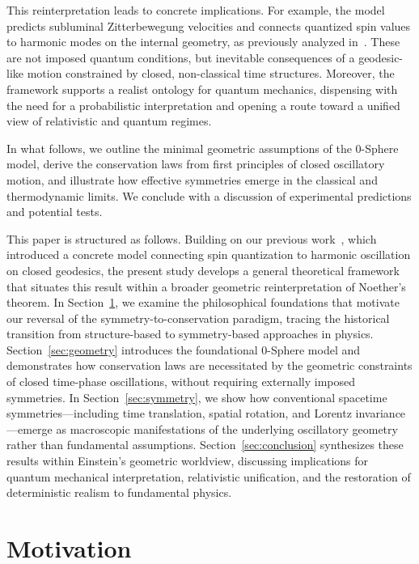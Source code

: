 \documentclass[%
 reprint,
 amsmath,amssymb,
 aps,
]{revtex4-1}
\numberwithin{equation}{section}%
\begin{document}
This reinterpretation leads to concrete implications. For example, the model predicts subluminal Zitterbewegung velocities and connects quantized spin values to harmonic modes on the internal geometry, as previously analyzed in~\cite{hanamura2507.0128}. These are not imposed quantum conditions, but inevitable consequences of a geodesic-like motion constrained by closed, non-classical time structures. Moreover, the framework supports a realist ontology for quantum mechanics, dispensing with the need for a probabilistic interpretation and opening a route toward a unified view of relativistic and quantum regimes.

In what follows, we outline the minimal geometric assumptions of the 0-Sphere model, derive the conservation laws from first principles of closed oscillatory motion, and illustrate how effective symmetries emerge in the classical and thermodynamic limits. We conclude with a discussion of experimental predictions and potential tests.

This paper is structured as follows. Building on our previous work~\cite{hanamura2506.0119,hanamura2507.0128}, which introduced a concrete model connecting spin quantization to harmonic oscillation on closed geodesics, the present study develops a general theoretical framework that situates this result within a broader geometric reinterpretation of Noether's theorem. In Section~\ref{sec:motivation}, we examine the philosophical foundations that motivate our reversal of the symmetry-to-conservation paradigm, tracing the historical transition from structure-based to symmetry-based approaches in physics. Section~\ref{sec:geometry} introduces the foundational 0-Sphere model and demonstrates how conservation laws are necessitated by the geometric constraints of closed time-phase oscillations, without requiring externally imposed symmetries. In Section~\ref{sec:symmetry}, we show how conventional spacetime symmetries—including time translation, spatial rotation, and Lorentz invariance—emerge as macroscopic manifestations of the underlying oscillatory geometry rather than fundamental assumptions. Section~\ref{sec:conclusion} synthesizes these results within Einstein's geometric worldview, discussing implications for quantum mechanical interpretation, relativistic unification, and the restoration of deterministic realism to fundamental physics.


\clearpage

\section{Motivation}
\label{sec:motivation}
\end{document}
